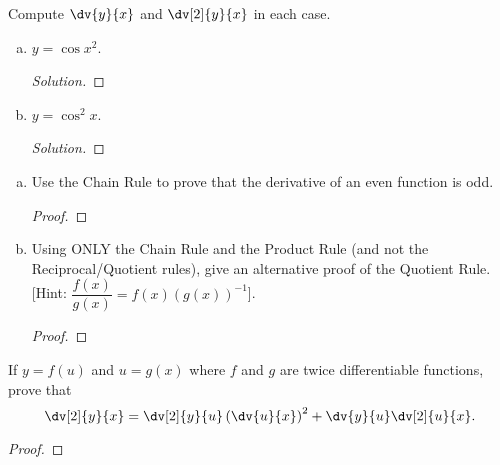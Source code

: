 \question Compute $\displaystyle\dv{y}{x}$ and $\displaystyle\dv[2]{y}{x}$ in each case.
\begin{enumerate}[(a)]
  \item $y=\cos x^2$.
        \begin{proof}[Solution]
        \end{proof}
  \item $y=\cos^2 x$.
        \begin{proof}[Solution]
        \end{proof}
\end{enumerate}


\question \begin{enumerate}[(a)]
  \item Use the Chain Rule to prove that the derivative of an even function is odd.
        \begin{proof}
        \end{proof}
  \item Using ONLY the Chain Rule and the Product Rule (and not the Reciprocal/Quotient rules),
        give an alternative proof of the Quotient Rule.
          [Hint: $\dfrac{f(x)}{g(x)}=f(x)(g(x))^{-1}$].
        \begin{proof}
        \end{proof}
\end{enumerate}


\question If $y=f(u)$ and $u=g(x)$ where $f$ and $g$ are twice differentiable functions, prove that
\[\dv[2]{y}{x} = \dv[2]{y}{u}\left(\dv{u}{x}\right)^2 + \dv{y}{u}\dv[2]{u}{x}. \]
\begin{proof}
\end{proof}

